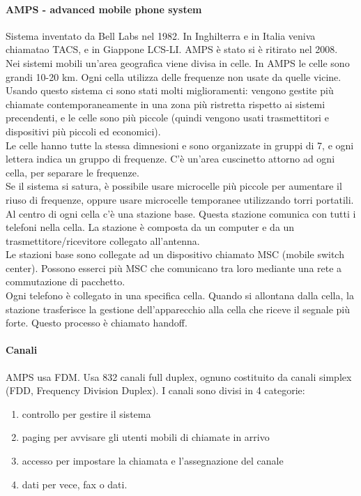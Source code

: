 \documentclass{article}
\begin{document}
	\paragraph{AMPS - advanced mobile phone system} Sistema inventato da Bell Labs nel 1982. In Inghilterra e in Italia veniva chiamatao TACS, e in Giappone LCS-LI. AMPS è stato si è ritirato nel 2008. \\
	Nei sistemi mobili un'area geografica viene divisa in celle. In AMPS le celle sono grandi 10-20 km. Ogni cella utilizza delle frequenze non usate da quelle vicine. \\
	Usando questo sistema ci sono stati molti miglioramenti: vengono gestite più chiamate contemporaneamente in una zona più ristretta rispetto ai sistemi precendenti, e le celle sono più piccole (quindi vengono usati trasmettitori e dispositivi più piccoli ed economici).\\
	Le celle hanno tutte la stessa dimnesioni e sono organizzate in gruppi di 7, e ogni lettera indica un gruppo di frequenze. C'è un'area cuscinetto attorno ad ogni cella, per separare le frequenze.\\
	Se il sistema si satura, è possibile usare microcelle più piccole per aumentare il riuso di frequenze, oppure usare microcelle temporanee utilizzando torri portatili. \\
	Al centro di ogni cella c'è una stazione base. Questa stazione comunica con tutti i telefoni nella cella. La stazione è composta da un computer e da un trasmettitore/ricevitore collegato all'antenna. \\
	Le stazioni base sono collegate ad un dispositivo chiamato MSC (mobile switch center). Possono esserci più MSC che comunicano tra loro mediante una rete a commutazione di pacchetto. \\
	Ogni telefono è collegato in una specifica cella. Quando si allontana dalla cella, la stazione trasferisce la gestione dell'apparecchio alla cella che riceve il segnale più forte. Questo processo è chiamato handoff.
	\paragraph{Canali} 
 	AMPS usa FDM. Usa 832 canali full duplex, ognuno costituito da canali simplex (FDD, Frequency Division Duplex). I canali sono divisi in 4 categorie:
 	\begin{enumerate}
 		\item controllo per gestire il sistema
 		\item paging per avvisare gli utenti mobili di chiamate in arrivo
 		\item accesso per impostare la chiamata e l'assegnazione del canale
 		\item dati per vece, fax o dati.
 	\end{enumerate}
\end{document}
